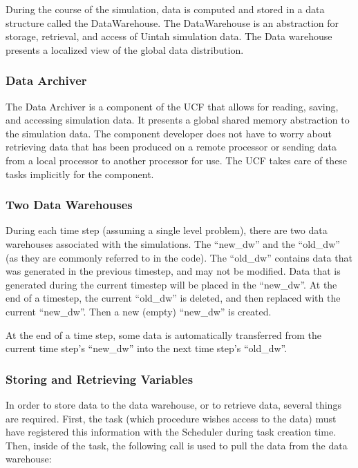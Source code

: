 \documentclass[12pt]{report}
\begin{document}
During the course of the simulation, data is computed and stored in a
data structure called the DataWarehouse.  The DataWarehouse is an abstraction
for storage, retrieval, and access of Uintah simulation data. The Data warehouse 
presents a localized view of the global data distribution.  

\subsubsection{Data Archiver}

The Data Archiver is a component of the UCF that allows for reading, saving, and accessing simulation data. 
It presents a global shared memory abstraction to the simulation data. The component developer does not have 
to worry about retrieving data that has been produced on a remote processor or sending data from a local processor 
to another processor for use. The UCF takes care of these tasks implicitly for the component. 

\subsubsection{Two Data Warehouses}

During each time step (assuming a single level problem), there are two data warehouses associated with the simulations. 
The ``new\_dw'' and the ``old\_dw'' (as they are commonly referred to in the code). The ``old\_dw'' contains data that 
was generated in the previous timestep, and may not be modified. Data that is generated during the current timestep will 
be placed in the ``new\_dw''. At the end of a timestep, the current ``old\_dw'' is deleted, and then replaced with the 
current ``new\_dw''. Then a new (empty) ``new\_dw'' is created.

At the end of a time step, some data is automatically transferred from the current time step's ``new\_dw'' into the next 
time step's ``old\_dw''. 

\subsubsection{Storing and Retrieving Variables}

In order to store data to the data warehouse, or to retrieve data, several things are required. First, the task (which 
procedure wishes access to the data) must have registered this information with the Scheduler during task creation time. 
Then, inside of the task, the following call is used to pull the data from the data warehouse: 
\end{document}
